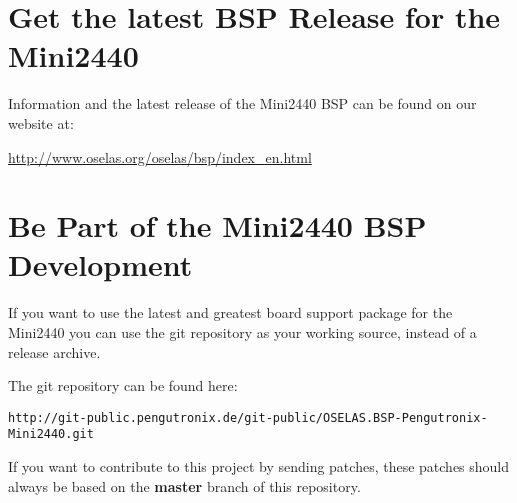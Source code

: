 
\section{Get the latest BSP Release for the Mini2440}

Information and the latest release of the Mini2440 BSP can be found on
our website at:

\url{http://www.oselas.org/oselas/bsp/index\_en.html}


\section{Be Part of the Mini2440 BSP Development}

If you want to use the latest and greatest board support package for the
Mini2440 you can use the git repository as your working source, instead
of a release archive.

The git repository can be found here:

\begin{center}
\texttt{http://git-public.pengutronix.de/git-public/OSELAS.BSP-Pengutronix-Mini2440.git}
\end{center}

If you want to contribute to this project by sending patches, these patches
should always be based on the \textbf{master} branch of this repository.

